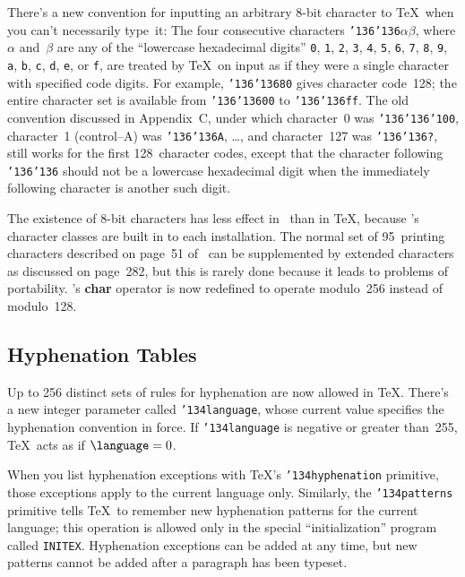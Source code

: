 There's a new convention for inputting an arbitrary 8-bit character
to \TeX\ when you can't necessarily type~it: The four consecutive
characters 
{\tt{\char'136\char'136}}$\alpha\beta$, where $\alpha$ and~$\beta$ are
any of the ``lowercase hexadecimal digits'' 
{\tt{0}},
{\tt{1}},
{\tt{2}},
{\tt{3}},
{\tt{4}},
{\tt{5}},
{\tt{6}},
{\tt{7}},
{\tt{8}},
{\tt{9}},
{\tt{a}},
{\tt{b}},
{\tt{c}},
{\tt{d}},
{\tt{e}},
or
{\tt{f}},
are treated by \TeX\ on input as if they were a single character with
specified code digits. For example, 
{\tt{\char'136\char'136}80}
gives character code~128; the entire character set
is available from
{\tt{\char'136\char'136}00}
to
{\tt{\char'136\char'136}ff}.
The old convention discussed in Appendix~C, under which character~0 was
{\tt{\char'136\char'136\char'100}},
character~1 (control--A) was
{\tt{\char'136\char'136}A},
\dots,
and character~127 was
{\tt{\char'136\char'136}?},
still works for the first 128~character codes, except that the
character following
{\tt{\char'136\char'136}}
should not be a lowercase hexadecimal digit when the immediately following
character is another such digit.

The existence of 8-bit characters has less effect
in \MF\ than in \TeX, because \MF's character classes are built in to each
installation. The normal set of 95~printing characters described on
page~51 of 
\MFbook\
can be supplemented by extended characters as discussed on page~282, but this
is rarely done because it leads to problems of portability. \MF's 
{\bf char} operator is now redefined to operate modulo~256 instead 
of modulo~128.

\subsection{Hyphenation Tables}

Up to 256 distinct sets of rules for hyphenation are now allowed in \TeX.
There's a new integer parameter called
{\tt{\char'134}language},
whose current value specifies the hyphenation convention in force. If
{\tt{\char'134}language}
is negative or greater than~255, \TeX\ acts as if 
$\hbox{\tt{\char'134}language}=0$.

When you list hyphenation exceptions with \TeX's 
{\tt{\char'134}hyphenation}
primitive, those exceptions apply to the current language only. Similarly,
the
{\tt{\char'134}patterns}
primitive tells \TeX\ to remember new hyphenation patterns for the current
language; this operation is allowed only in the special ``initialization''
program called {\tt INITEX}\null. Hyphenation exceptions can be added at any
time, but new patterns cannot be added after a paragraph has been typeset.

